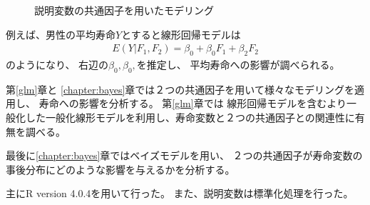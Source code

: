 \begin{figure}[H]
	\caption{説明変数の共通因子を用いたモデリング}
	\label{ModelSuppression}
\end{figure}



例えば、男性の平均寿命$Y$とすると線形回帰モデルは
\begin{eqnarray}
E(Y|F_1, F_2)=\beta_0 +\beta_0F_1 + \beta_2 F_2
\end{eqnarray}
のようになり、
右辺の$\beta_0, \beta_0, $を推定し、
平均寿命への影響が調べられる。

第\ref{glm}章と
\ref{chapter:bayes}章では２つの共通因子を用いて様々なモデリングを適用し、
寿命への影響を分析する。
第\ref{glm}章では
線形回帰モデルを含むより一般化した一般化線形モデルを利用し、寿命変数と２つの共通因子との関連性に有無を調べる。

最後に\ref{chapter:bayes}章ではベイズモデルを用い、
２つの共通因子が寿命変数の事後分布にどのような影響を与えるかを分析する。


主にR version 4.0.4を用いて行った。
また、説明変数は標準化処理を行った。





%
%



%
%
%
%
%
%
%
%
%

